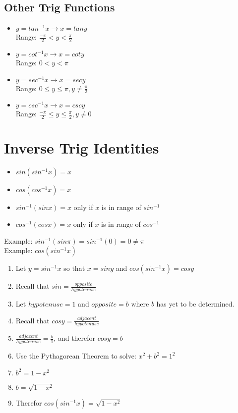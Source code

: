 \documentclass{article}
\begin{document}
\subsection{Other Trig Functions}
\begin{itemize}
  \item {
  $y = tan^{-1}x \to x = tany$\\
  Range: $\frac{-\pi}{2} < y < \frac{\pi}{2}$
  }
  \item {
  $y = cot^{-1}x \to x = coty$\\
  Range: $0 < y < \pi$
  }
  \item {
  $y = sec^{-1}x \to x = secy$\\
  Range: $0 \leq y \leq \pi, y \neq\frac{\pi}{2}$
  }
  \item {
  $y = csc^{-1}x \to x = cscy$\\
  Range: $\frac{-\pi}{2} \leq y \leq \frac{\pi}{2}, y \neq 0$
  }
\end{itemize}

\section{Inverse Trig Identities}
\begin{itemize}
  \item $sin(sin^{-1}x) = x$
  \item $cos(cos^{-1}x) = x$
  \item $sin^{-1}(sinx) = x$ only if $x$ is in range of $sin^{-1}$
  \item $cos^{-1}(cosx) = x$ only if $x$ is in range of $cos^{-1}$
\end{itemize}

Example: $sin^{-1}(sin\pi) = sin^{-1}(0) = 0 \neq \pi$\\

Example: $cos(sin^{-1}x)$
\begin{enumerate}
  \item {Let $y = sin^{-1}x$ so that $x = siny$ and $cos(sin^{-1}x) = cosy$\\}
  \item {Recall that $sin = \frac{opposite}{hypotenuse}$\\}
  \item {Let $hypotenuse = 1$ and $opposite = b$ where $b$ has yet to be determined.\\}
  \item {Recall that $cosy = \frac{adjacent}{hypotenuse}$\\}
  \item {$\frac{adjacent}{hypotenuse} = \frac{b}{1}$, and therefor $cosy = b$\\}
  \item {Use the Pythagorean Theorem to solve: $x^2 + b^2 = 1^2$\\}
  \item {$b^2 = 1 - x^2$\\}
  \item {$b = \sqrt{1 - x^2}$\\}
  \item {Therefor $cos(sin^{-1}x) = \sqrt{1 - x^2}$}
\end{enumerate}
\end{document}
